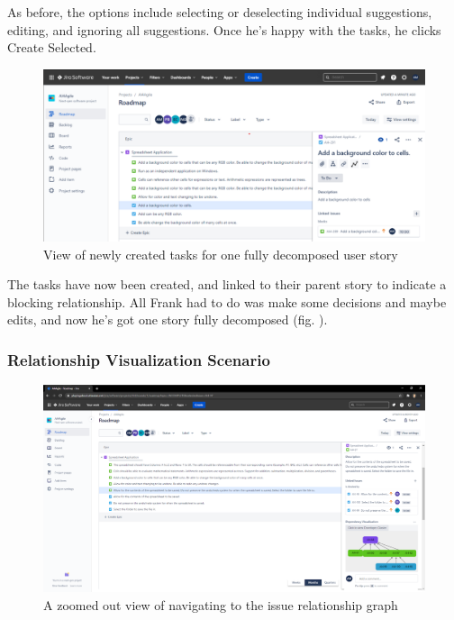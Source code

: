 As before, the options include selecting or deselecting individual suggestions, editing, and ignoring all suggestions. Once he’s happy with the tasks, he clicks Create Selected.

\begin{figure}
\centerline{\includegraphics[width=\textwidth,height=\textheight,keepaspectratio]{./figure/Scenario1Figure5.png}}
\caption{View of newly created tasks for one fully decomposed user story}
\label{fig:Scenario1Figure5}
\end{figure}

The tasks have now been created, and linked to their parent story to indicate a blocking relationship. All Frank had to do was make some decisions and maybe edits, and now he’s got one story fully decomposed (fig. \label{fig:Scenario1Figure5}).

\subsubsection{Relationship Visualization Scenario}
\label{Scenario2}

\begin{figure}
\centerline{\includegraphics[width=\textwidth,height=\textheight,keepaspectratio]{./figure/Scenario2Figure1.png}}
\caption{A zoomed out view of navigating to the issue relationship graph}
\label{fig:Scenario2Figure1}
\end{figure}

